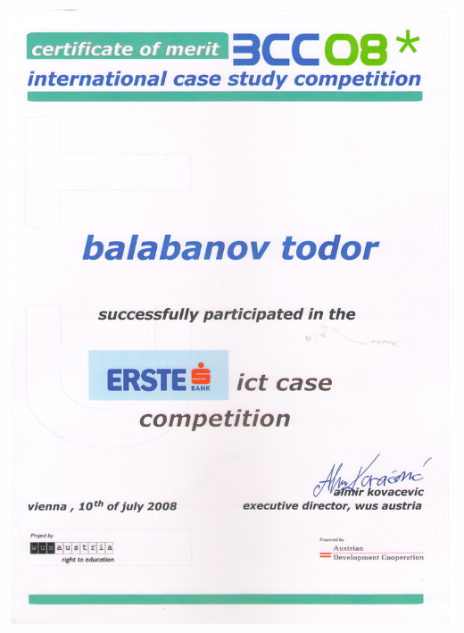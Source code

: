 \documentclass[bulgarian,a4paper]{europasscv}
\begin{document}
\includegraphics[width=\textwidth,height=\textheight,keepaspectratio]{BCC2008}
\end{document}
